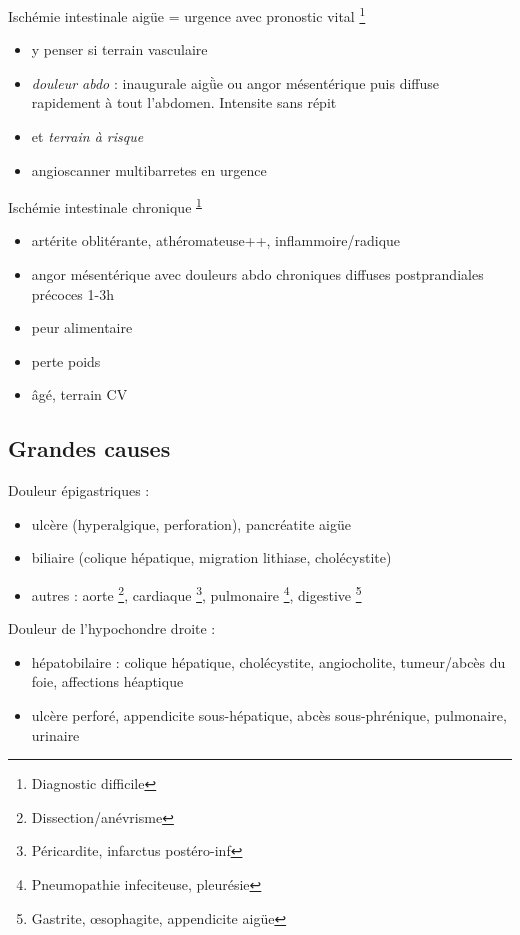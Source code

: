 \documentclass[11pt]{article}
\begin{document}
Ischémie intestinale aigüe = urgence avec pronostic vital \faBomb \footnote{Diagnostic difficile\label{org2da56b0}}
\begin{itemize}
\item y penser si terrain vasculaire
\item \emph{douleur abdo} : inaugurale aigǜe ou angor mésentérique puis diffuse rapidement
à tout l'abdomen. Intensite \inc{} sans répit
\item et \emph{terrain à risque}
\item angioscanner multibarretes en urgence
\end{itemize}
Ischémie intestinale chronique \textsuperscript{\ref{org2da56b0}}
\begin{itemize}
\item artérite oblitérante, athéromateuse++, inflammoire/radique
\item angor mésentérique avec douleurs abdo chroniques diffuses postprandiales
précoces 1-3h
\item peur alimentaire
\item perte poids
\item âgé, terrain CV
\end{itemize}

\subsection{Grandes causes}
\label{sec:org9868973}
Douleur épigastriques : 
\begin{itemize}
\item ulcère (hyperalgique, perforation), pancréatite aigüe
\item biliaire (colique hépatique, migration lithiase, cholécystite)
\item autres : aorte \footnote{Dissection/anévrisme}, cardiaque \footnote{Péricardite, infarctus postéro-inf}, pulmonaire \footnote{Pneumopathie infeciteuse, pleurésie}, digestive \footnote{Gastrite, \oe{}sophagite, appendicite aigüe}
\end{itemize}

Douleur de l'hypochondre droite :
\begin{itemize}
\item hépatobilaire : colique hépatique, cholécystite, angiocholite, tumeur/abcès du
foie, affections héaptique
\item ulcère perforé, appendicite sous-hépatique, abcès sous-phrénique,
pulmonaire, urinaire
\end{itemize}
\end{document}
